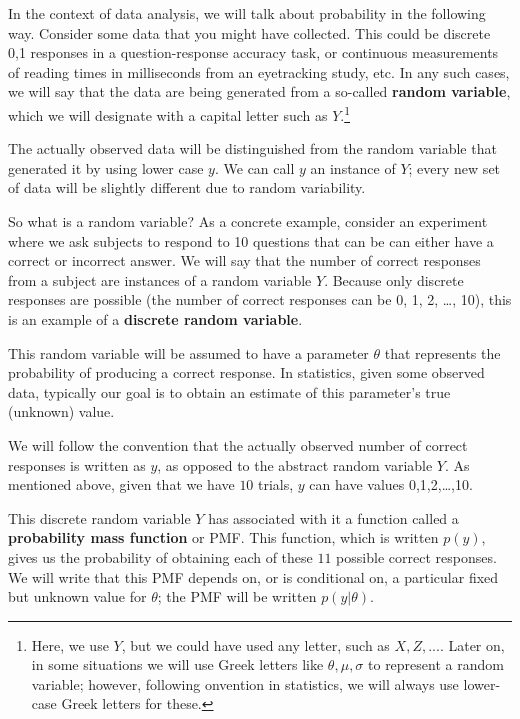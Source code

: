 \documentclass[12pt,]{krantz}
\theoremstyle{definition}
\theoremstyle{definition}
\theoremstyle{definition}
\theoremstyle{remark}
\begin{document}
In the context of data analysis, we will talk about probability in the following way. Consider some data that you might have collected. This could be discrete 0,1 responses in a question-response accuracy task, or continuous measurements of reading times in milliseconds from an eyetracking study, etc. In any such cases, we will say that the data are being generated from a so-called \textbf{random variable}, which we will designate with a capital letter such as \(Y\).\footnote{Here, we use \(Y\), but we could have used any letter, such as \(X, Z,...\). Later on, in some situations we will use Greek letters like \(\theta, \mu, \sigma\) to represent a random variable; however, following onvention in statistics, we will always use lower-case Greek letters for these.}

The actually observed data will be distinguished from the random variable that generated it by using lower case \(y\). We can call \(y\) an instance of \(Y\); every new set of data will be slightly different due to random variability.

So what is a random variable? As a concrete example, consider an experiment where we ask subjects to respond to 10 questions that can be can either have a correct or incorrect answer. We will say that the number of correct responses from a subject are instances of a random variable \(Y\). Because only discrete responses are possible (the number of correct responses can be 0, 1, 2, \ldots{}, 10), this is an example of a \textbf{discrete random variable}.

This random variable will be assumed to have a parameter \(\theta\) that represents the probability of producing a correct response. In statistics, given some observed data, typically our goal is to obtain an estimate of this parameter's true (unknown) value.

We will follow the convention that the actually observed number of correct responses is written as \(y\), as opposed to the abstract random variable \(Y\). As mentioned above, given that we have \(10\) trials, \(y\) can have values 0,1,2,\ldots{},10.

This discrete random variable \(Y\) has associated with it a function called a \textbf{probability mass function} or PMF. This function, which is written \(p(y)\), gives us the probability of obtaining each of these \(11\) possible correct responses. We will write that this PMF depends on, or is conditional on, a particular fixed but unknown value for \(\theta\); the PMF will be written \(p(y|\theta)\).
\end{document}
